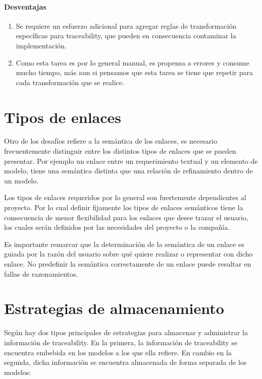 \documentclass[a4paper,12pt,oneside]{book}
\begin{document}
\paragraph{Desventajas}

\begin{enumerate}

\item     Se requiere un esfuerzo adicional para agregar reglas de transformación específicas para traceability, que pueden en consecuencia contaminar la implementación.

\item    Como esta tarea es por lo general manual, es propensa a errores y consume mucho tiempo, más aun si pensamos que esta tarea se tiene que repetir para cada transformación que se realice.

\end{enumerate}

\section{Tipos de enlaces}

Otro de los desafíos refiere a la semántica de los enlaces, es necesario frecuentemente distinguir entre los distintos tipos de enlaces que se pueden presentar. Por ejemplo un enlace entre un requerimiento textual y un elemento de modelo, tiene una semántica distinta que una relación de refinamiento dentro de un modelo. 

Los tipos de enlaces requeridos por lo general son fuertemente dependientes al proyecto. Por lo cual definir fijamente los tipos de enlaces semánticos tiene la consecuencia de menor flexibilidad para los enlaces que desee trazar el usuario, los cuales serán definidos por las necesidades del proyecto o la compañía. 

Es importante remarcar que la determinación de la semántica de un enlace es guiada por la razón del usuario sobre qué quiere realizar o representar con dicho enlace. No predefinir la semántica correctamente de un enlace puede resultar en fallas de razonamientos.

\section{Estrategias de almacenamiento}

Según \cite{DrivalosPaigeFernandesKolovos} hay dos tipos principales de estrategias para almacenar y administrar la información de traceability. En la primera, la información de traceability se encuentra embebida en los modelos a los que ella refiere. En cambio en la segunda, dicha información se encuentra almacenada de forma separada de los modelos:
\end{document}
